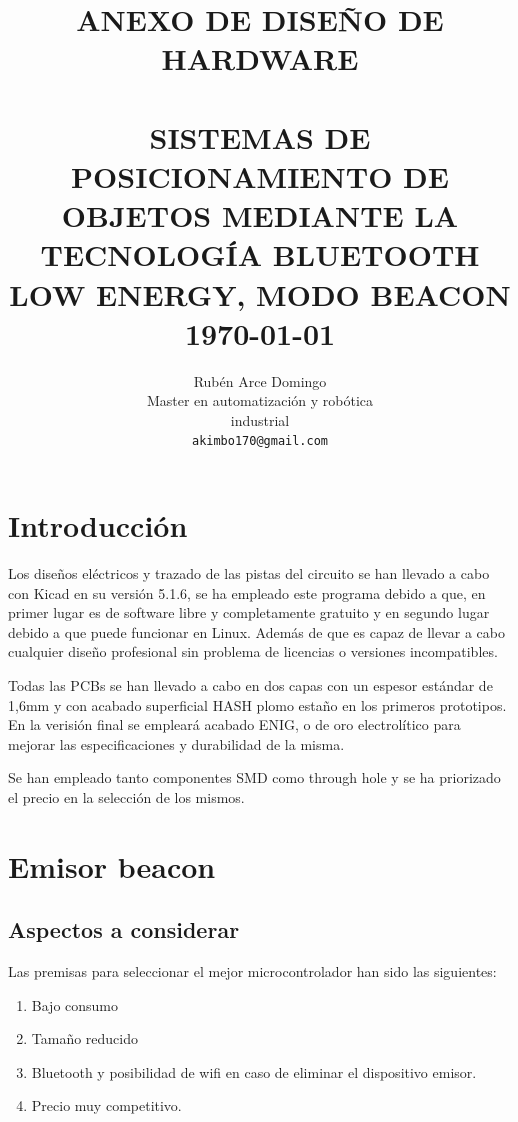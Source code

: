 \documentclass[paper=a4, fontsize=11pt,twoside]{scrartcl}	%
\title{	\normalsize \textsc{ANEXO DE DISEÑO DE HARDWARE} 	%
		 	\\[2.0cm]								%
			\HRule{0.5pt} \\						%
			\LARGE \textbf{\uppercase{Sistemas de posicionamiento de objetos mediante la tecnología Bluetooth Low Energy, modo Beacon}}	%
			\HRule{2pt} \\ [0.5cm]		%
			\normalsize \today			%
		}
\author{
		Rubén Arce Domingo\\	
		Master en automatización y robótica\\	
		industrial\\
        \texttt{akimbo170@gmail.com} \\
}
\makeatletter
\def\printtitle{%
    {\centering \@title\par}}
\def\printauthor{%
    {\centering \large \@author}}
\makeatother
\begin{document}
\thispagestyle{empty}		%
\printtitle					%
  	\vfill
\printauthor				%
\newpage


\cleardoublepage
\tableofcontents
\listoffigures
\cleardoublepage

\section{Introducción}
    Los diseños eléctricos y trazado de las pistas del circuito se han llevado a cabo con Kicad en 
    su versión 5.1.6, se ha empleado este programa debido a que, en primer lugar es de software libre y
    completamente gratuito y en segundo lugar debido a que puede funcionar en Linux. Además de que es capaz de llevar a cabo 
    cualquier diseño profesional sin problema de licencias o versiones incompatibles.

    Todas las PCBs se han llevado a cabo en dos capas con un espesor estándar de 1,6mm y con acabado superficial
    HASH plomo estaño en los primeros prototipos. En la verisión final se empleará acabado ENIG, o de oro 
    electrolítico para mejorar las especificaciones y durabilidad de la misma.

    Se han empleado tanto componentes SMD como through hole y se ha priorizado el precio en la selección de los mismos.
\section{Emisor beacon}
    \subsection{Aspectos a considerar}
        Las premisas para seleccionar el mejor microcontrolador han sido las siguientes: 
        \begin{enumerate}
            \item Bajo consumo
            \item Tamaño reducido
            \item Bluetooth y posibilidad de wifi en caso de eliminar el dispositivo emisor.
            \item Precio muy competitivo.
        \end{enumerate}
\end{document}
